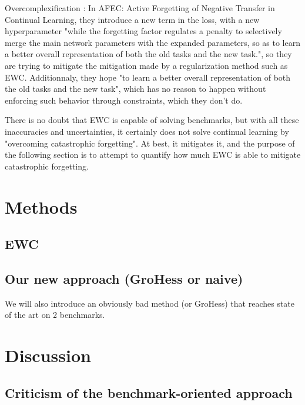 \documentclass[twocolumn]{article}
\begin{document}
\vspace{1mm}
\noindent
Overcomplexification : In AFEC: Active Forgetting of Negative Transfer in Continual Learning, they introduce a new term in the loss, with a new hyperparameter "while the forgetting factor regulates a penalty to selectively merge the main network parameters with the expanded parameters, so as to learn a better overall representation of both the old tasks and the new task.", so they are trying to mitigate the mitigation made by a regularization method such as EWC. Additionnaly, they hope "to learn a better overall representation of both the old tasks and the new task", which has no reason to happen without enforcing such behavior through constraints, which they don't do.

There is no doubt that EWC is capable of solving benchmarks, but with all these inaccuracies and uncertainties, it certainly does not solve continual learning by "overcoming catastrophic forgetting". At best, it mitigates it, and the purpose of the following section is to attempt to quantify how much EWC is able to mitigate catastrophic forgetting.



\section{Methods}



\subsection{EWC}


\subsection{Our new approach (GroHess or naive)}

We will also introduce an obviously bad method (or GroHess) that reaches state of the art on 2 benchmarks.



\section{Discussion}

\subsection{Criticism of the benchmark-oriented approach}
\end{document}
